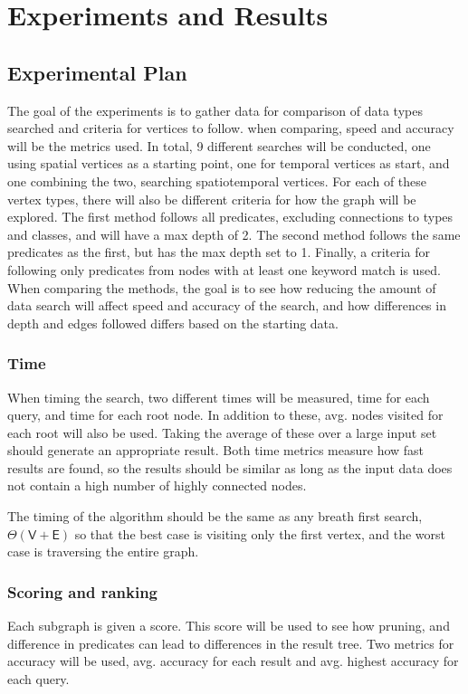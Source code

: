 \chapter{Experiments and Results}
\label{cha:Experiments}

\section{Experimental Plan}
\label{sec:experimentalPlan}
The goal of the experiments is to gather data for comparison of data types searched and criteria for vertices to follow. when comparing, speed and accuracy will be the metrics used. In total, 9 different searches will be conducted, one using spatial vertices as a starting point, one for temporal vertices as start, and one combining the two, searching spatiotemporal vertices. For each of these vertex types, there will also be different criteria for how the graph will be explored. The first method follows all predicates, excluding connections to types and classes, and will have a max depth of 2. The second method follows the same predicates as the first, but has the max depth set to 1. Finally, a criteria for following only predicates from nodes with at least one keyword match is used.
When comparing the methods, the goal is to see how reducing the amount of data search will affect speed and accuracy of the search, and how differences in depth and edges followed differs based on the starting data.

\subsection{Time}
When timing the search, two different times will be measured, time for each query, and time for each root node. In addition to these, avg. nodes visited for each root will also be used. Taking the average of these over a large input set should generate an appropriate result. Both time metrics measure how fast results are found, so the results should be similar as long as the input data does not contain a high number of highly connected nodes.

The timing of the algorithm should be the same as any breath first search, $\Theta(\mathsf{V} + \mathsf{E})$ so that the best case is visiting only the first vertex, and the worst case is traversing the entire graph.

\subsection{Scoring and ranking}
Each subgraph is given a score. This score will be used to see how pruning, and difference in predicates can lead to differences in the result tree. Two metrics for accuracy will be used, avg. accuracy for each result and avg. highest accuracy for each query.

